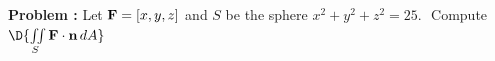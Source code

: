 {\bf Problem :} Let $\text{\bf F} = [x,y,z]$ and $S$ be the sphere $x^2+y^2+z^2 = 25$.  \,\,Compute \,$\D{\iint \limits_{S} \text{\bf F}\cdot \text{\bf n} \, dA}$

